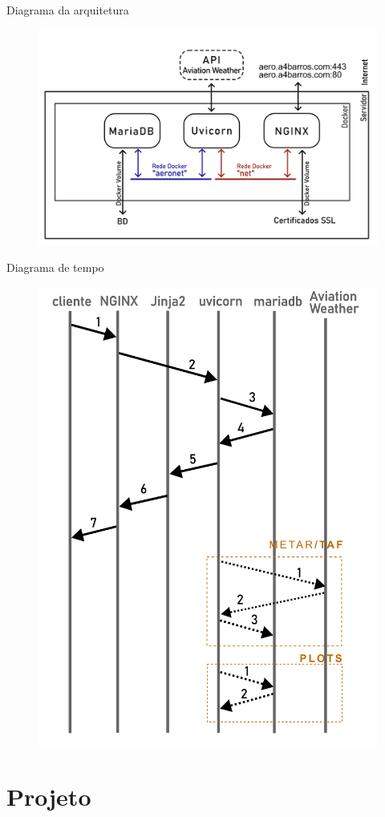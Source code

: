 \documentclass{beamer}
\begin{document}
\begin{frame}{Diagrama da arquitetura}
    \begin{figure}[ht]
        \begin{center}
        \includegraphics[width=0.8\linewidth]{img/diagrama-arquitetura.png}
        \label{fig:arquitetura}
        \end{center}
    \end{figure}
\end{frame}

\begin{frame}{Diagrama de tempo}
    \begin{figure}[ht]
        \begin{center}
        \includegraphics[width=0.4\linewidth]{img/diagrama-tempo.png}
        \label{fig:arquitetura}
        \end{center}
    \end{figure}
\end{frame}


\section{Projeto}
\end{document}
